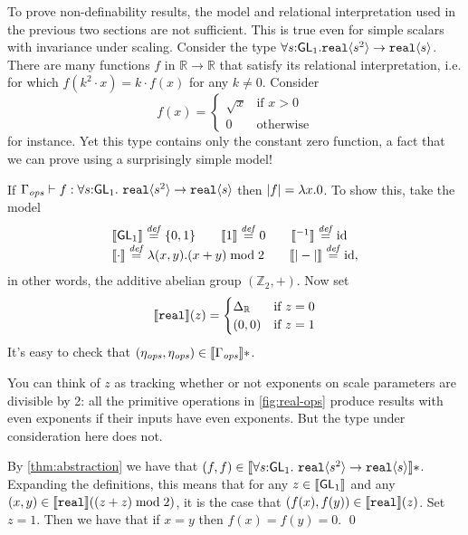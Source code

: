 \newcommand{\Grp}{\mathit{Gr}}
To prove non-definability results, the model and relational interpretation
used in the previous two sections are not sufficient.
This is true even for simple scalars with invariance under scaling.
Consider the type 
$\forall s \mathord: \mathsf{GL}_1.\textup{\texttt{real}}\langle s^2 \rangle \to \textup{\texttt{real}}\langle s \rangle$. 
There are many functions $f$ in $\mathbb R \to \mathbb R$
that satisfy its relational interpretation, i.e. for which $f(k^2\cdot x) = k\cdot f(x)$ for 
any $k\neq 0$.
Consider 
\[
f(x) = \begin{cases}\sqrt x & \text{if }x > 0\\0&\text{otherwise}\end{cases}
\]
for instance. Yet this type contains only the constant zero function, a fact that
we can prove using a surprisingly simple model!

\begin{example}\label{ex:sqrt-root-nondef}
If  $\Gamma_{\mathit{ops}} \vdash f : \forall s \mathord: \mathsf{GL}_1.\
\textup{\texttt{real}}\langle s^2 \rangle \to \textup{\texttt{real}}\langle s \rangle$ 
then $\left| f\right| = \lambda x.0$.
To show this, take the model
\[
\begin{array}{l}
\llbracket \mathsf{GL}_1 \rrbracket \stackrel{\mathit{def}}= \{0,1\}\qquad
\llbracket 1 \rrbracket \stackrel{\mathit{def}}= 0 \qquad
\llbracket {}^{-1} \rrbracket  \stackrel{\mathit{def}}= \mathrm{id}\\
\llbracket \cdot \rrbracket \stackrel{\mathit{def}}= \lambda(x,y).(x+y)\mathrel{\mathrm{mod}} 2
\qquad
\llbracket |-| \rrbracket \stackrel{\mathit{def}}= \mathrm{id},

\end{array}
\]
in other words, the additive abelian group $(\mathbb Z_2, +)$. 
Now set
\[
\llbracket \textup{\texttt{real}} \rrbracket(z) = 
  \begin{cases} \Delta_{\mathbb R} & \text{if }z=0\\
                      {(0,0)} & \text{if }z=1
\end{cases}
\]
It's easy to check that $(\eta_{\mathit{ops}},\eta_{\mathit{ops}})\in\llbracket \Gamma_{\mathit{ops}} \rrbracket*$.

You can think of $z$ as tracking whether or not exponents on scale
parameters are divisible by 2: all the primitive operations in
\autoref{fig:real-ops} produce results with even exponents if their
inputs have even exponents. But the type under consideration here does
not.

By \autoref{thm:abstraction} we have that $(f,f)\in\llbracket \forall s
  \mathord: \mathsf{GL}_1.\ \textup{\texttt{real}}\langle s^2 \rangle \to \textup{\texttt{real}}\langle s \rangle \rrbracket *$.
Expanding the definitions, this means that for any
$z\in\llbracket \mathsf{GL}_1 \rrbracket$ and any
$(x,y)\in\llbracket \textup{\texttt{real}} \rrbracket((z+z)\mathrel\textrm{mod}2)$, it is the case that
$(f(x),f(y))\in\llbracket \textup{\texttt{real}} \rrbracket(z)$. Set $z = 1$.  
Then we have that if $x=y$ then $f(x)=f(y)=0$.
\qed
\end{example}

